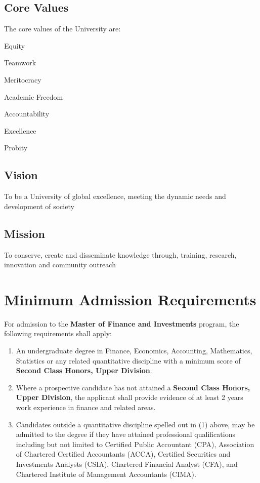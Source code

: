 \documentclass[16,a4paperpaper,]{article}
\begin{document}
\subsection{Core Values}

The core values of the University are:

\begin{center}

Equity

Teamwork

Meritocracy

Academic Freedom

Accountability

Excellence

Probity

\end{center}

\subsection{Vision}

To be a University of global excellence, meeting the dynamic needs and
development of society

\subsection{Mission}

To conserve, create and disseminate knowledge through, training,
research, innovation and community outreach

\section{Minimum Admission Requirements}

For admission to the \textbf{Master of Finance and Investments} program,
the following requirements shall apply:

\begin{enumerate}
\def\labelenumi{\arabic{enumi}.}
\item
  An undergraduate degree in Finance, Economics, Accounting,
  Mathematics, Statistics or any related quantitative discipline with a
  minimum score of \textbf{Second Class Honors, Upper Division}.
\item
  Where a prospective candidate has not attained a \textbf{Second Class
  Honors, Upper Division}, the applicant shall provide evidence of at
  least 2 years work experience in finance and related areas.
\item
  Candidates outside a quantitative discipline spelled out in (1) above,
  may be admitted to the degree if they have attained professional
  qualifications including but not limited to Certified Public
  Accountant (CPA), Association of Chartered Certified Accountants
  (ACCA), Certified Securities and Investments Analysts (CSIA),
  Chartered Financial Analyst (CFA), and Chartered Institute of
  Management Accountants (CIMA).
\end{enumerate}
\end{document}
